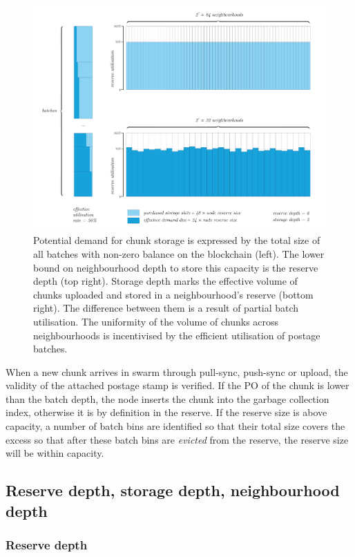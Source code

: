 \begin{figure}[!ht]
  \centering
    \includegraphics[width=.9\textwidth]{fig/supply-demand.pdf}
  \caption[Reserve capacity]{Potential demand for chunk storage is expressed by the total size of all batches with non-zero balance on the blockchain (left). The lower bound on neighbourhood depth to store this capacity is the reserve depth (top right). Storage depth marks the effective volume of chunks uploaded and stored in a neighbourhood's reserve (bottom right). The difference between them is a result of partial batch utilisation. The uniformity of the volume of chunks across neighbourhoods is incentivised by the efficient utilisation of postage batches.}
\label{fig:reserve-capacity}
\end{figure}    

When a new chunk arrives in swarm through pull-sync, push-sync or upload, the validity  of the attached  postage stamp is verified. If the PO of the chunk is lower than the batch depth, the node inserts the chunk into the  garbage collection index, otherwise it is by definition in the reserve. 
If the reserve size is above capacity, a number of batch bins are identified so that their total size covers the excess so that after these batch bins are \emph{evicted} from the reserve, the reserve size will be within capacity. 


\subsection{Reserve depth, storage depth, neighbourhood depth}\label{sec:depths}



\subsubsection{Reserve depth}

